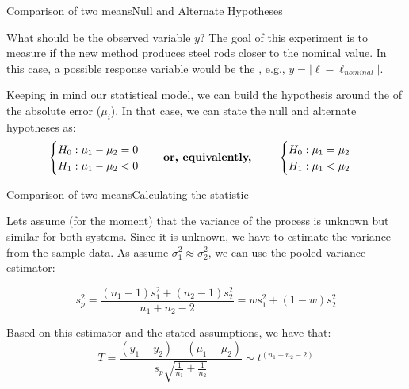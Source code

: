 \begin{frame}{Comparison of two means}{Null and Alternate Hypotheses}

What should be the observed variable $y$? The goal of this experiment is to measure if the new method produces steel rods closer to the nominal value. In this case, a possible response variable would be the , e.g., $y = |\ell - \ell_{nominal}|$.\bigskip

Keeping in mind our statistical model, we can build the hypothesis around the  of the absolute error ($\mu_i$). In that case, we can state the null and alternate hypotheses as:
\begin{equation*}
\begin{cases}
H_0: \mu_1 - \mu_2 = 0\\
H_1: \mu_1 - \mu_2 < 0
\end{cases}\ \ \ \mbox{\textbf{or, equivalently, }}\ \ \ \ \ \ \begin{cases}
H_0: \mu_1 = \mu_2\\
H_1: \mu_1 < \mu_2
\end{cases}
\end{equation*}
\medskip
\end{frame}



\begin{frame}{Comparison of two means}{Calculating the statistic}

  Lets assume (for the moment) that the variance of the process is unknown but similar for both systems. Since it is unknown, we have to estimate the variance from the sample data. As assume $\sigma^2_1\approx\sigma^2_2$, we can use the pooled variance estimator:

\begin{equation*}
s_p^2 = \frac{\left(n_1-1\right)s_1^2+\left(n_2-1\right)s_2^2}{n_1+n_2-2}=ws_1^2+\left(1-w\right)s_2^2
\end{equation*}
\bigskip

Based on this estimator and the stated assumptions, we have that:
\begin{equation*}
T = \frac{\left(\bar{y_1} - \bar{y_2}\right) - \left(\mu_1 - \mu_2\right)}{s_p\sqrt{\frac{1}{n_1} + \frac{1}{n_2}}}\sim t^{\left(n_1+n_2-2\right)}
\end{equation*}
\end{frame}


